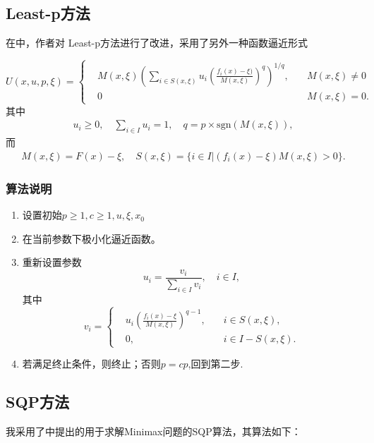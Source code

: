 \documentclass[a4paper,  11pt]{ctexart}
\begin{document}
\subsection{Least-p方法}
在\cite{leastp}中，作者对
Least-p方法进行了改进，采用了另外一种函数逼近形式

\begin{equation}
  U(x,u,p,\xi) = \left\{ 
  \begin{aligned}
  &M(x,\xi)\left(\sum_{i\in S(x,\xi)} 
  u_i\left(\frac{f_i(x)-\xi)}{M(x,\xi)}\right)^q
  \right)^{1/q},\quad &M(x,\xi)\neq 0\\ 
  &0 \quad & M(x,\xi)=0.
\end{aligned}
  \right.
\end{equation}
其中 
\begin{align}
  u_i\geq 0,\quad \sum_{i\in I} u_i = 1,\quad q =
  p\times\text{sgn}(M(x,\xi)),
\end{align}
而
\begin{align}
   M(x,\xi)=F(x)-\xi,\quad S(x,\xi) = \{i\in I| (f_i(x)-\xi)M(x,\xi) >
   0\}.
\end{align}
\subsubsection*{算法说明}
\begin{enumerate}
  \item 设置初始$p\geq 1,c\geq 1,u,\xi,x_0$
  \item 在当前参数下极小化逼近函数。
  \item 重新设置参数
    \[
       u_i = \frac{v_i}{\sum_{i\in I} v_i}, \quad i\in I,
    \]
    其中
    \[
         v_i = \left\{
         \begin{aligned}
           &u_i\left( \frac{f_i(x)-\xi}{M(x,\xi)}\right)^{q-1},\quad
           &i\in S(x,\xi),\\ 
           &0,\quad &i\in I - S(x,\xi).
         \end{aligned}
         \right.
    \]
  \item 若满足终止条件，则终止；否则$p=cp$,回到第二步.
\end{enumerate}
\subsection{SQP方法}
我采用了\cite{SQP}中提出的用于求解Minimax问题的SQP算法，其算法如下：
\end{document}
